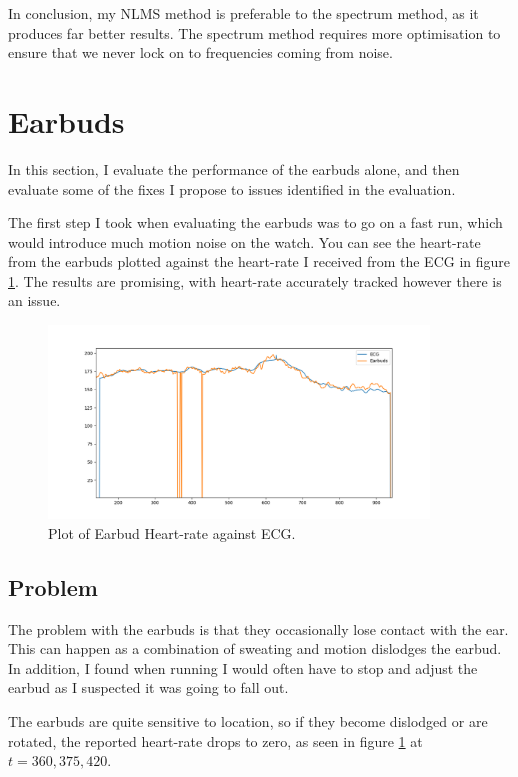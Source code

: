 \documentclass[12pt,a4paper,twoside,openright]{report}
\begin{document}
In conclusion, my NLMS method is preferable to the spectrum method, as it
produces far better results. The spectrum method requires more optimisation to
ensure that we never lock on to frequencies coming from noise.

\section{Earbuds}

In this section, I evaluate the performance of the earbuds alone, and then
evaluate some of the fixes I propose to issues identified in the evaluation.

The first step I took when evaluating the earbuds was to go on a fast run,
which would introduce much motion noise on the watch. You can see the
heart-rate from the earbuds plotted against the heart-rate I received from the
ECG in figure \ref{fig:earbud-fast}. The results are promising, with
heart-rate accurately tracked however there is an issue.

\begin{figure}[H]
	\centerline{\includegraphics[width=0.9\textwidth]{figs/earbud-fast-graph.png}}
	\caption{Plot of Earbud Heart-rate against ECG.}
	\label{fig:earbud-fast}
\end{figure}

\subsection{Problem} \label{sec:earbud-problem}

The problem with the earbuds is that they occasionally lose contact with the
ear. This can happen as a combination of sweating and motion dislodges the
earbud. In addition, I found when running I would often have to stop and
adjust the earbud as I suspected it was going to fall out. 

The earbuds are quite sensitive to location, so if they become dislodged or
are rotated, the reported heart-rate drops to zero, as seen in figure
\ref{fig:earbud-fast} at $t=360, 375, 420$.
\end{document}
